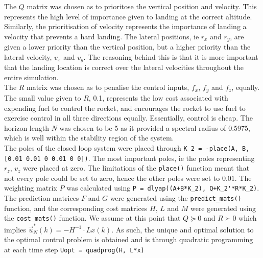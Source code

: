 \documentclass[conference, tikz]{IEEEtran}
\begin{document}
The $Q$ matrix was chosen as to prioritose the vertical position and velocity.
This represents the high level of importance given to landing at the correct altitude. 
Similarly, the prioritisation of velocity represents the importance of landing a velocity that prevents a hard landing.
The lateral positions, ie $r_x$ and $r_y$, are given a lower priority than the vertical position, but a higher priority than the lateral velocity, $v_x$ and $v_y$.
The reasoning behind this is that it is more important that the landing location is correct over the lateral velocities throughout the entire simulation. 
\\
The $R$ matrix was chosen as to penalise the control inputs, $f_x$, $f_y$ and $f_z$, equally.
The small value given to $R$, 0.1, represents the low cost associated with expending fuel to control the rocket, and encourages the rocket to use fuel to exercise control in all three directions equally. Essentially, control is cheap. 
The horizon length $N$ was chosen to be 5 as it provided a spectral radius of 0.5975, which is well within the stability region of the system.
\\
The poles of the closed loop system were placed through \verb|K_2 = -place(A, B, [0.01 0.01 0 0.01 0 0])|.
The most important poles, ie the poles representing $r_z$, $v_z$ were placed at zero. 
The limitations of the \verb|place()| function meant that not every pole could be set to zero, hence the other poles were set to $0.01$. 
The weighting matrix $P$ was calculated using \verb|P = dlyap((A+B*K_2), Q+K_2'*R*K_2)|.
The prediction matrices $F$ and $G$ were generated using the \verb|predict_mats()| function, and the corresponding cost matrices $H$, $L$ and $M$ were generated using the \verb|cost_mats()| function. 
We assume at this point that $Q\succeq 0$ and $R \succ 0$ which implies $\vec u^*_N(k) = -H^{-1}\cdot Lx(k)$.
As such, the unique and optimal solution to the optimal control problem is obtained and is through quadratic programming at each time step \verb|Uopt = quadprog(H, L*x)|
\\
\end{document}

